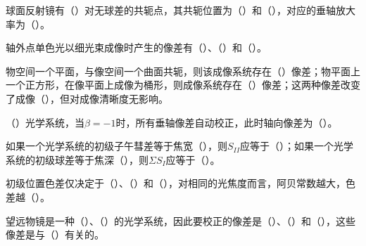 \documentclass[standard, analysis, notocnum]{ExBook}
\newcommand{\answerarea}[1][8cm]{%
  \par\vspace{2mm}%
  \noindent{\color{themeColor!35}\rule{\linewidth}{0.4pt}}\par
  \noindent\begin{minipage}[t][#1][t]{\linewidth}\vspace{0pt}\end{minipage}\par
  \noindent{\color{themeColor!35}\rule{\linewidth}{0.4pt}}\par
}
\begin{document}
\begin{qitems}
\begin{bbox}
\answerarea[3.5cm]
\end{bbox}
\begin{bbox}
\qitem 球面反射镜有（\hspace{1.6em}）对无球差的共轭点，其共轭位置为（\hspace{1.6em}）和（\hspace{1.6em}），对应的垂轴放大率为（\hspace{1.6em}）。
\answerarea[3.5cm]
\end{bbox}
\begin{bbox}
\qitem 轴外点单色光以细光束成像时产生的像差有（\hspace{1.6em}）、（\hspace{1.6em}）和（\hspace{1.6em}）。
\answerarea[3.5cm]
\end{bbox}
\begin{bbox}
\qitem 物空间一个平面，与像空间一个曲面共轭，则该成像系统存在（\hspace{1.6em}）像差；物平面上一个正方形，在像平面上成像为桶形，则成像系统存在（\hspace{1.6em}）像差；这两种像差改变了成像（\hspace{1.6em}），但对成像清晰度无影响。
\answerarea[3.5cm]
\end{bbox}
\begin{bbox}
\qitem （\hspace{1.6em}）光学系统，当$\beta =-1$时，所有垂轴像差自动校正，此时轴向像差为（\hspace{1.6em}）。
\answerarea[3.5cm]
\end{bbox}
\begin{bbox}
\qitem 如果一个光学系统的初级子午彗差等于焦宽（\hspace{1.6em}），则$S_{II}$应等于（\hspace{1.6em}）；如果一个光学系统的初级球差等于焦深（\hspace{1.6em}），则$\Sigma S_{I}$应等于（\hspace{1.6em}）。
\answerarea[3.5cm]
\end{bbox}
\begin{bbox}
\qitem 初级位置色差仅决定于（\hspace{1.6em}）、（\hspace{1.6em}）和（\hspace{1.6em}），对相同的光焦度而言，阿贝常数越大，色差越（\hspace{1.6em}）。
\answerarea[3.5cm]
\end{bbox}
\begin{bbox}
\qitem 望远物镜是一种（\hspace{1.6em}）、（\hspace{1.6em}）的光学系统，因此要校正的像差是（\hspace{1.6em}）、（\hspace{1.6em}）和（\hspace{1.6em}），这些像差是与（\hspace{1.6em}）有关的。

\end{bbox}
\end{qitems}
\end{document}
